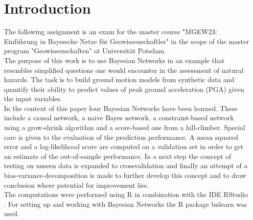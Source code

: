 
\chapter{Introduction} %

\label{Chapter1} %

The following assignment is an exam for the master course "MGEW23: Einführung in Bayessche Netze für Geowissenschaftler" in the scope of the master program "Geowissenschaften" at Universität Potsdam.\\
The purpose of this work is to use Bayesian Networks in an example that resembles simplified questions one would encounter in the assessment of natural hazards. The task is to build ground motion models from synthetic data and quantify their ability to predict values of peak ground acceleration (PGA) given the input variables.\\
In the context of this paper four Bayesian Networks have been learned. These include a causal network, a naive Bayes network, a constraint-based network using a grow-shrink algorithm and a score-based one from a hill-climber. Special care is given to the evaluation of the prediction performance. A mean squared error and a log-likelihood score are computed on a validation set in order to get an estimate of the out-of-sample performance. In a next step the concept of testing on unseen data is expanded to crossvalidation and finally an attempt of a bias-variance-decomposition is made to further develop this concept and to draw conclusion where potential for improvement lies.\\
The computations were performed using R \citep{R} in combination with the IDE RStudio \citep{Rstudio}. For setting up and working with Bayesian Networks the R package bnlearn \citep{bnlearn} was used.